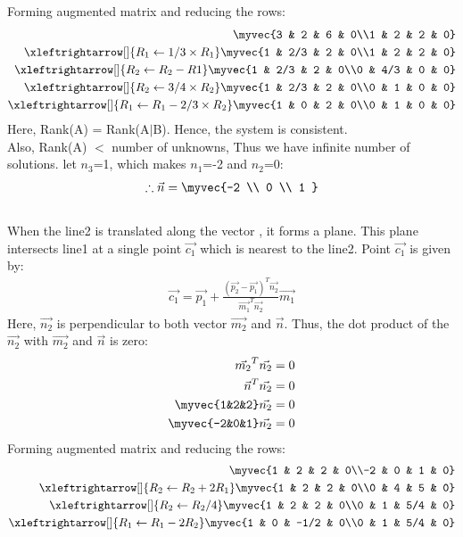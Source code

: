 \documentclass[journal,12pt,twocolumn]{IEEEtran}
\begin{document}
Forming augmented matrix and reducing the rows:
\begin{align}
\myvec{3 & 2 & 6 & 0\\1 & 2 & 2 & 0}\\
\xleftrightarrow[]{R_1\leftarrow 1/3\times R_1}
\myvec{1 & 2/3 & 2 & 0\\1 & 2 & 2 & 0}\\
\xleftrightarrow[]{R_2\leftarrow R_2-R1}
\myvec{1 & 2/3 & 2 & 0\\0 & 4/3 & 0 & 0}\\
\xleftrightarrow[]{R_2\leftarrow 3/4 \times R_2}
\myvec{1 & 2/3 & 2 & 0\\0 & 1 & 0 & 0}\\
\xleftrightarrow[]{R_1\leftarrow R_1-2/3\times R_2}
\myvec{1 & 0 & 2 & 0\\0 & 1 & 0 & 0}
\end{align} 
Here, Rank(A) = Rank(A$\mid$B). Hence, the system is consistent. 
\\
Also, Rank(A) $<$ number of unknowns, Thus we have infinite number of solutions. let $n_3$=1, which makes $n_1$=-2 and $n_2$=0:
\begin{align}
    \therefore \vec{n}=\myvec{-2 \\ 0 \\ 1 }
\end{align}
\\
When the line2 is translated along the vector , it forms a plane. This plane intersects line1 at a single point $\vec{c_1}$ which is nearest to the line2. Point $\vec{c_1}$ is given by:
\\
\begin{align}
\vec{c_1}=\vec{p_1}+\frac{(\vec{p_2}-\vec{p_1})^T \vec{n_2}}{\vec{m_1}^T \vec{n_2}}\vec{m_1} 
\end{align}
Here, $\Vec{n_2}$ is perpendicular to both vector $\Vec{m_2}$ and $\Vec{n}$. Thus, the dot product of the $\Vec{n_2}$ with $\Vec{m_2}$ and $\Vec{n}$ is zero:
\begin{align}
    \vec{m_2}^T\vec{n_2} =  0\\
    \vec{n}^T\vec{n_2} =  0\\
    \myvec{1&2&2}\vec{n_2}=0\\
    \myvec{-2&0&1}\vec{n_2}=0
\end{align}
Forming augmented matrix and reducing the rows:
\begin{align}
\myvec{1 & 2 & 2 & 0\\-2 & 0 & 1 & 0}\\
\xleftrightarrow[]{R_2\leftarrow R_2+2R_1}
\myvec{1 & 2 & 2 & 0\\0 & 4 & 5 & 0}\\
\xleftrightarrow[]{R_2\leftarrow R_2/4}
\myvec{1 & 2 & 2 & 0\\0 & 1 & 5/4 & 0}\\
\xleftrightarrow[]{R_1\leftarrow R_1-2R_2}
\myvec{1 & 0 & -1/2 & 0\\0 & 1 & 5/4 & 0}
\end{align} 
\end{document}
